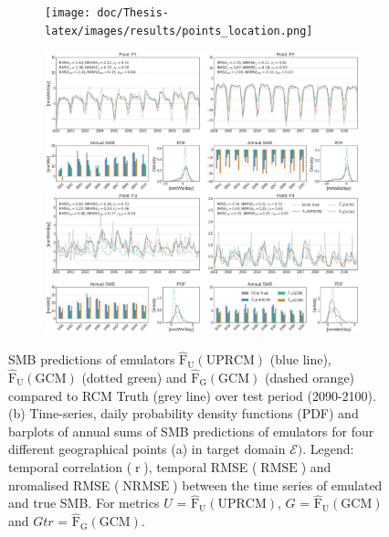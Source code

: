 \documentclass[a4paper,11pt,oneside]{report}
\begin{document}
\begin{figure}[tbp]
        \centering
        \begin{subfigure}[b]{0.2\columnwidth}
            \centering \texttt{[image: doc/Thesis-latex/images/results/points\_location.png]}
            \caption[]%
            {{\small}}    
          \label{fig:points-location}
        \end{subfigure}
        \hfill
        \begin{subfigure}[b]{\columnwidth}  
            \centering 
           \includegraphics[width=\textwidth]{doc/Thesis-latex/images/results/timeseries_RCM_GCM.pdf}
            \caption[]%
            {{\small }}  
          \label{fig:timeseries-GCM-UPRCM}
        \end{subfigure}
        \hfill
        \caption[]
        {\small SMB predictions of emulators $\mathrm{\hat{F}_{U}(UPRCM)}$ (blue line), $\mathrm{\hat{F}_{U}(GCM)}$ (dotted green) and $\mathrm{\mathrm{\hat{F}_{G}(GCM)}}$ (dashed orange) compared to RCM Truth (grey line) over test period (2090-2100). 
        (b) Time-series, daily probability density functions (PDF) and barplots of annual sums of SMB predictions of emulators for four different geographical points (a) in target domain $\mathcal{E})$.
        Legend: temporal correlation ($\operatorname{r}$), temporal RMSE ($\operatorname{RMSE}$) and nromalised RMSE ($\operatorname{NRMSE}$) between the time series of emulated and true SMB. For metrics $U$ = $\mathrm{\hat{F}_{U}(UPRCM)}$, $G$ = $\mathrm{\hat{F}_{U}(GCM)}$ and $Gtr$ = $\mathrm{\hat{F}_{G}(GCM)}$.} 
        \label{fig:points-timeseries-GCM-UPRCM}
    \end{figure}
\end{document}
